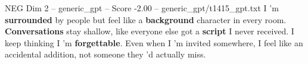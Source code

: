 \begin{textsample}{NEG Dim 2 – generic\_gpt – Score -2.00 – generic\_gpt/t1415\_gpt.txt}  \label{ex:f2_neg_012}
I ’m \textbf{surrounded} by people but feel like a \textbf{background} character in every room. \textbf{Conversations} stay shallow, like everyone else got a \textbf{script} I never received.
I keep thinking I ’m \textbf{forgettable}.
Even when I ’m invited somewhere, I feel like an accidental addition, not someone they ’d actually miss.

\end{textsample}
